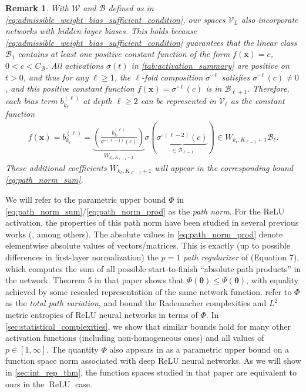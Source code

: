 \documentclass{article}
\DeclareMathOperator{\ReLU}{\mathrm{ReLU}}
\def\vtheta{{\bm{\theta}}}
\def\vx{{\bm{x}}}
\def\cB{{\mathcal{B}}}
\def\cV{{\mathcal{V}}}
\def\cW{{\mathcal{W}}}
\newtheorem{remark}[theorem]{Remark}
\begin{document}
\begin{remark} \label{remark:biased_net_representation}
    With $\cW$ and $\cB$ defined as in \eqref{eq:admissible_weight_bias_sufficient_condition}, our spaces $\cV_L$ also incorporate networks with hidden-layer biases. This holds because \eqref{eq:admissible_weight_bias_sufficient_condition} guarantees that the linear class $\cB_1$ contains at least one positive constant function of the form $f(\vx) = c$, $0 < c < C_{\cB}$. All activations $\sigma(t)$ in \cref{tab:activation_summary} are positive on $t > 0$, and thus for any $\ell \geq 1$, the $\ell$-fold composition $\sigma^{\circ \ell}$ satisfies $\sigma^{\circ \ell}(c) \neq 0$, and this positive constant function $ f(\vx) = \sigma^{\circ \ell} (c)$ is in $\cB_{\ell+1}$. Therefore, each bias term $b_{k_\ell}^{(\ell)}$ at depth $\ell \geq 2$ can be represented in $\cV_\ell$ as the constant function
    \begin{align}
        f(\vx) = b_{k_\ell}^{(\ell)} =  \underbrace{\left( \frac{b_{k_\ell}^{(\ell)}}{\sigma^{\circ (\ell-1)} (c)}  \right)}_{\displaystyle  W_{k_\ell,K_{\ell-1} + 1}} \sigma \left( \underbrace{\sigma^{\circ (\ell-2)} (c)}_{\displaystyle \in \cB_{\ell-1}} \right) \in W_{k_\ell,K_{\ell-1} + 1} \cB_\ell.
    \end{align}
    These additional coefficients $W_{k_\ell, K_{\ell-1}+1}$ will appear in the corresponding bound \eqref{eq:path_norm_sum}.
\end{remark}


We will refer to the parametric upper bound $\Phi$ in \eqref{eq:path_norm_sum}/\eqref{eq:path_norm_prod} as the \textit{path norm}. For the ReLU activation, the properties of this path norm have been studied in several previous works (\cite{neyshabur2015norm,barron2019complexity,wojtowytsch2020banach}, among others). The absolute values in \eqref{eq:path_norm_prod} denote elementwise absolute values of vectors/matrices. This is exactly (up to possible differences in first-layer normalization) the $p=1$ \textit{path regularizer} of \cite{neyshabur2015norm} (Equation 7), which computes the sum of all possible start-to-finish ``absolute path products'' in the network. Theorem 5 in that paper shows that $\Phi(\vtheta) \leq \Psi(\vtheta)$, with equality achieved by some rescaled representation of the same network function. \cite{barron2019complexity} refer to $\Phi$ as the \textit{total path variation}, and bound the Rademacher complexities and $L^2$ metric entropies of ReLU neural networks in terms of $\Phi$. In \cref{sec:statistical_complexities}, we show that similar bounds hold for many other activation functions (including non-homogeneous ones) and all values of $p \in [1,\infty]$. The quantity $\Phi$ also appears in \cite{wojtowytsch2020banach} as a parametric upper bound on a function space norm associated with deep ReLU neural networks. As we will show in \cref{sec:int_rep_thm}, the function spaces studied in that paper are equivalent to ours in the $\ReLU$ case.
\end{document}
